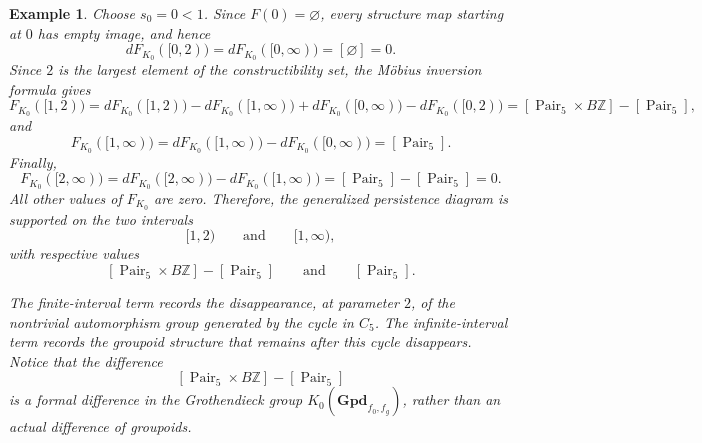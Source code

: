 \documentclass{amsart}
\newcommand{\Z}{\mathbb{Z}}
\newtheorem{example}[theorem]{Example}
\begin{document}
\begin{example}
Choose \(s_0=0<1\). Since \(F(0)=\varnothing\), every structure map
starting at \(0\) has empty image, and hence
\[
dF_{K_0}([0,2))
=
dF_{K_0}([0,\infty))
=
[\varnothing]
=
0.
\]
Since \(2\) is the largest element of the constructibility set, the
M\"obius inversion formula gives
\[F_{K_0}([1,2))
=
dF_{K_0}([1,2))
-dF_{K_0}([1,\infty))
+dF_{K_0}([0,\infty))
-dF_{K_0}([0,2))
=
[\operatorname{Pair}_5\times B\Z]
-
[\operatorname{Pair}_5],
\]
and
\[F_{K_0}([1,\infty))
=
dF_{K_0}([1,\infty))
-dF_{K_0}([0,\infty))
=
[\operatorname{Pair}_5].\]
Finally,
\[F_{K_0}([2,\infty))
=
dF_{K_0}([2,\infty))
-dF_{K_0}([1,\infty))
=
[\operatorname{Pair}_5]-[\operatorname{Pair}_5]
=0.
\]
All other values of \(F_{K_0}\) are zero. Therefore, the generalized
persistence diagram is supported on the two intervals
\[
[1,2)
\qquad\text{and}\qquad
[1,\infty),
\]
with respective values
\[
[\operatorname{Pair}_5\times B\Z]
-
[\operatorname{Pair}_5]
\qquad\text{and}\qquad
[\operatorname{Pair}_5].
\]

The finite-interval term records the disappearance, at parameter \(2\),
of the nontrivial automorphism group generated by the cycle in \(C_5\).
The infinite-interval term records the groupoid structure that remains
after this cycle disappears. Notice that the difference
\[
[\operatorname{Pair}_5\times B\Z]
-
[\operatorname{Pair}_5]
\]
is a formal difference in the Grothendieck group
\(K_0(\mathbf{Gpd}_{f_0,f_g})\), rather than an actual difference of
groupoids.
\end{example}
\end{document}
